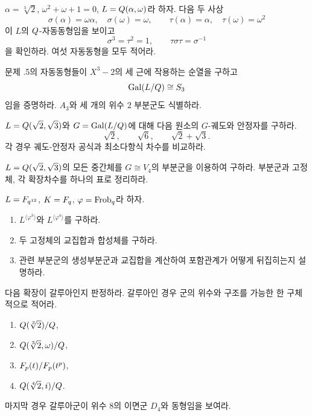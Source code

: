 \begin{exercise}[*]
$\alpha=\sqrt[3]{2}$, $\omega^2+\omega+1=0$, $L=Q(\alpha,\omega)$라 하자. 다음 두 사상
\[
  \sigma(\alpha)=\omega\alpha,\quad\sigma(\omega)=\omega,
  \qquad
  \tau(\alpha)=\alpha,\quad\tau(\omega)=\omega^2
\]
이 $L$의 $Q$-자동동형임을 보이고
\[
  \sigma^3=\tau^2=1,
  \qquad
  \tau\sigma\tau=\sigma^{-1}
\]
을 확인하라. 여섯 자동동형을 모두 적어라.
\end{exercise}

\begin{exercise}[*]
문제 \thechapter.5의 자동동형들이 $X^3-2$의 세 근에 작용하는 순열을 구하고
\[
  \operatorname{Gal}(L/Q)\cong S_3
\]
임을 증명하라. $A_3$와 세 개의 위수 $2$ 부분군도 식별하라.
\end{exercise}

\begin{exercise}
$L=Q(\sqrt2,\sqrt3)$와 $G=\operatorname{Gal}(L/Q)$에 대해 다음 원소의 $G$-궤도와 안정자를 구하라.
\[
  \sqrt2,\qquad \sqrt6,\qquad \sqrt2+\sqrt3.
\]
각 경우 궤도-안정자 공식과 최소다항식 차수를 비교하라.
\end{exercise}

\begin{exercise}[*]
$L=Q(\sqrt2,\sqrt3)$의 모든 중간체를 $G\cong V_4$의 부분군을 이용하여 구하라. 부분군과 고정체, 각 확장차수를 하나의 표로 정리하라.
\end{exercise}

\begin{exercise}
$L=F_{q^{12}}$, $K=F_q$, $\varphi=\operatorname{Frob}_q$라 하자.
\begin{enumerate}[label=(\alph*)]
  \item $L^{\langle\varphi^3\rangle}$와 $L^{\langle\varphi^4\rangle}$를 구하라.
  \item 두 고정체의 교집합과 합성체를 구하라.
  \item 관련 부분군의 생성부분군과 교집합을 계산하여 포함관계가 어떻게 뒤집히는지 설명하라.
\end{enumerate}
\end{exercise}

\begin{exercise}[*]
다음 확장이 갈루아인지 판정하라. 갈루아인 경우 군의 위수와 구조를 가능한 한 구체적으로 적어라.
\begin{enumerate}[label=(\alph*)]
  \item $Q(\sqrt[3]{2})/Q$,
  \item $Q(\sqrt[3]{2},\omega)/Q$,
  \item $F_p(t)/F_p(t^p)$,
  \item $Q(\sqrt[4]{2},i)/Q$.
\end{enumerate}
마지막 경우 갈루아군이 위수 $8$의 이면군 $D_4$와 동형임을 보여라.
\end{exercise}

